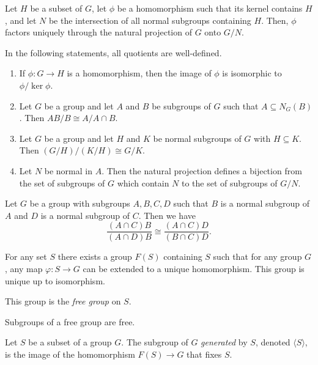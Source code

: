\begin{prop}
    Let $H$ be a subset of $G$, let $\phi$ be a homomorphism such that its
    kernel contains $H$, and let $N$ be the intersection of all normal
    subgroups containing $H$. Then, $\phi$ factors uniquely through the natural
    projection of $G$ onto $G/N$.
\end{prop}
\begin{thm}
    In the following statements, all quotients are well-defined.
    \begin{enumerate}
        \item If $\phi:G\to H$ is a homomorphism, then the image of $\phi$ is
            isomorphic to $\phi/\ker\phi$.
        \item Let $G$ be a group and let $A$ and $B$ be subgroups of $G$ such that
        $A\subseteq N_G(B)$.
        Then $AB/B\cong A/A\cap B$.
        \item Let $G$ be a group and let $H$ and $K$ be normal subgroups of $G$
            with $H\subseteq K$. Then $(G/H)/(K/H)\cong G/K$.
        \item Let $N$ be normal in $A$. Then the natural projection defines a
            bijection from the set of subgroups of $G$ which contain $N$ to the
            set of subgroups of $G/N$.
    \end{enumerate}
\end{thm}
\begin{lem}[Butterfly]
    Let $G$ be a group with subgroups $A,B,C,D$ such that $B$ is a normal
    subgroup of $A$ and $D$ is a normal subgroup of $C$. Then we have
    \[{\frac
    {(A\cap C)B}{(A\cap D)B}}\cong {\frac {(A\cap C)D}{(B\cap C)D}}.\]
\end{lem}
\begin{prop}
    For any set $S$ there exists a group $F(S)$ containing $S$ such that for any
    group $G$, any map $\varphi:S\to G$ can be extended to a unique
    homomorphism. This group is unique up to isomorphism.
\end{prop}
\begin{defn}
    This group is the \emph{free group} on $S$.
\end{defn}
\begin{thm}[Schreier]
    Subgroups of a free group are free.
\end{thm}
\begin{defn}
    Let $S$ be a subset of a group $G$. The subgroup of $G$ \emph{generated} by
    $S$, denoted $\langle S\rangle$, is the image of the homomorphism $F(S)\to
    G$ that fixes $S$.
\end{defn}
